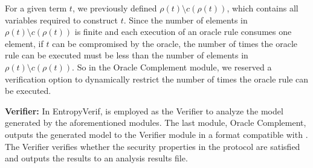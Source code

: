 \documentclass[../main.tex]{subfiles}  %
\begin{document}
For a given term $t$, we previously defined $\rho(t) \setminus c(\rho(t))$, which contains all variables required to construct $t$.
Since the number of elements in $\rho(t) \setminus c(\rho(t))$ is finite and each execution of an oracle rule consumes one element, 
if $t$ can be compromised by the oracle, the number of times the oracle rule can be executed must be less than the number of elements in $\rho(t) \setminus c(\rho(t))$.
So in the Oracle Complement module, we reserved a verification option to dynamically restrict the number of times the oracle rule can be executed.

\noindent
\textbf{Verifier:} 
In EntropyVerif, \Tamarin{} is employed as the Verifier to analyze the model generated by the aforementioned modules.
The last module, Oracle Complement, outputs the generated model to the Verifier module in a format compatible with \Tamarin{}. 
The Verifier verifies whether the security properties in the protocol are satisfied and outputs the results to an analysis results file.
\end{document}
